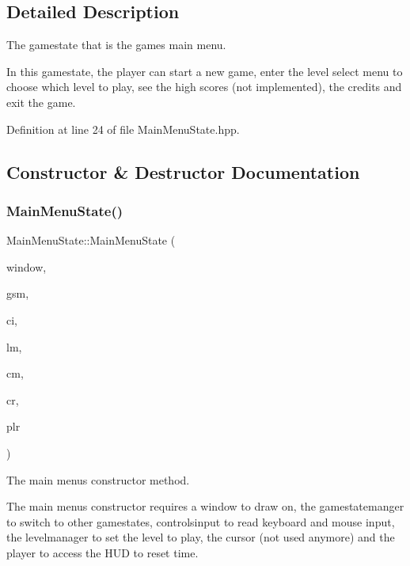 \subsection{Detailed Description}
The gamestate that is the game\textquotesingle{}s main menu. 

In this gamestate, the player can start a new game, enter the level select menu to choose which level to play, see the high scores (not implemented), the credits and exit the game. 

Definition at line 24 of file Main\+Menu\+State.\+hpp.



\subsection{Constructor \& Destructor Documentation}
\mbox{\label{class_main_menu_state_a319907358bf3fbbc42cab50ac5fdebdc}} 
\subsubsection{\texorpdfstring{Main\+Menu\+State()}{MainMenuState()}}
{\footnotesize\ttfamily Main\+Menu\+State\+::\+Main\+Menu\+State (\begin{DoxyParamCaption}\item[{sf\+::\+Render\+Window \&}]{window,  }\item[{\hyperlink{class_game_state_manager}{Game\+State\+Manager} \&}]{gsm,  }\item[{\hyperlink{struct_controls_input}{Controls\+Input} \&}]{ci,  }\item[{\hyperlink{class_level_manager}{Level\+Manager} \&}]{lm,  }\item[{\hyperlink{class_camera}{Camera} \&}]{cm,  }\item[{\hyperlink{class_cursor}{Cursor} \&}]{cr,  }\item[{\hyperlink{class_player}{Player} \&}]{plr }\end{DoxyParamCaption})}



The main menu\textquotesingle{}s constructor method. 

The main menu\textquotesingle{}s constructor requires a window to draw on, the gamestatemanger to switch to other gamestates, controlsinput to read keyboard and mouse input, the levelmanager to set the level to play, the cursor (not used anymore) and the player to access the H\+UD to reset time. 

